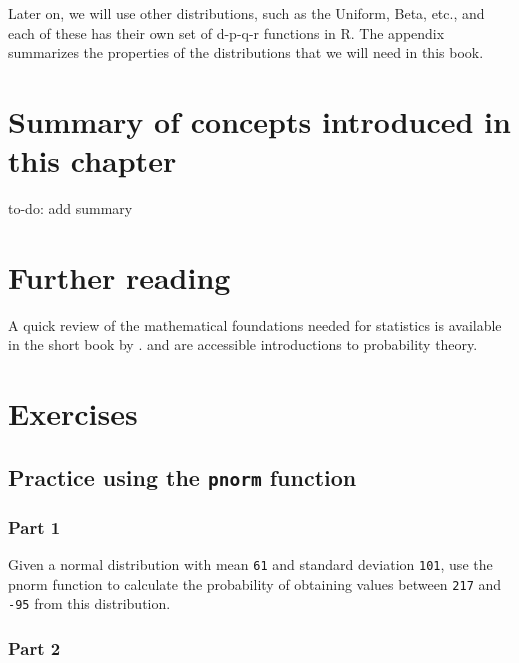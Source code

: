 \documentclass[12pt,]{krantz}
\let\BeginKnitrBlock\begin \let\EndKnitrBlock\end
\begin{document}
Later on, we will use other distributions, such as the Uniform, Beta, etc., and each of these has their own set of d-p-q-r functions in R. The appendix summarizes the properties of the distributions that we will need in this book.

\hypertarget{summary-of-concepts-introduced-in-this-chapter}{%
\section{Summary of concepts introduced in this chapter}\label{summary-of-concepts-introduced-in-this-chapter}}

\BeginKnitrBlock{rmdnote}
to-do: add summary
\EndKnitrBlock{rmdnote}

\hypertarget{further-reading}{%
\section{Further reading}\label{further-reading}}

A quick review of the mathematical foundations needed for statistics is available in the short book by \citet{fox2009mathematical}. \citet{morin2016probability} and \citet{blitzstein2014introduction} are accessible introductions to probability theory.

\hypertarget{exercises}{%
\section{Exercises}\label{exercises}}

\hypertarget{practice-using-the-pnorm-function}{%
\subsection{\texorpdfstring{Practice using the \texttt{pnorm} function}{Practice using the pnorm function}}\label{practice-using-the-pnorm-function}}

\hypertarget{part-1}{%
\subsubsection{Part 1}\label{part-1}}

Given a normal distribution with mean \texttt{61} and standard deviation \texttt{101}, use the pnorm function to calculate the probability of obtaining values between \texttt{217} and \texttt{-95} from this distribution.

\hypertarget{part-2}{%
\subsubsection{Part 2}\label{part-2}}
\end{document}

